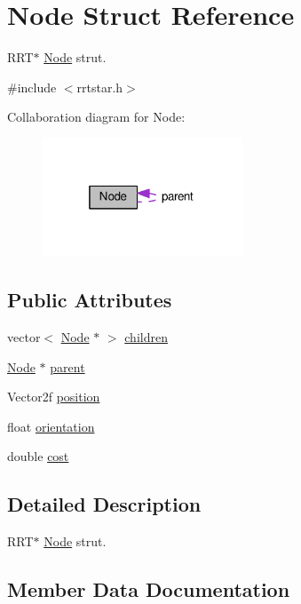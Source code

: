 \hypertarget{structNode}{}\section{Node Struct Reference}
\label{structNode}


R\+R\+T$\ast$ \hyperlink{structNode}{Node} strut.  




{\ttfamily \#include $<$rrtstar.\+h$>$}



Collaboration diagram for Node\+:\nopagebreak
\begin{figure}[H]
\begin{center}
\leavevmode
\includegraphics[width=169pt]{structNode__coll__graph}
\end{center}
\end{figure}
\subsection*{Public Attributes}
\begin{DoxyCompactItemize}
\item 
vector$<$ \hyperlink{structNode}{Node} $\ast$ $>$ \hyperlink{structNode_a4403c570a373595bc3f82a8ca0bd2e61}{children}
\item 
\hyperlink{structNode}{Node} $\ast$ \hyperlink{structNode_ad8184598cdea70e4bbdfd76f2b0f9e85}{parent}
\item 
Vector2f \hyperlink{structNode_a4894d1352134bef767e5c1aba7aa3207}{position}
\item 
float \hyperlink{structNode_a7515a1624b4a54ed344792f3458c167d}{orientation}
\item 
double \hyperlink{structNode_a6e7b74adca863064ca0d1684873f33e0}{cost}
\end{DoxyCompactItemize}


\subsection{Detailed Description}
R\+R\+T$\ast$ \hyperlink{structNode}{Node} strut. 

\subsection{Member Data Documentation}
